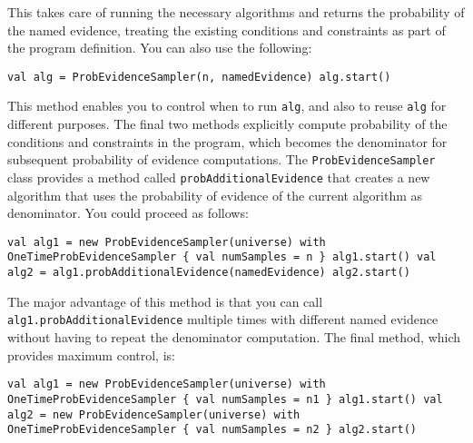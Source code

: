This takes care of running the necessary algorithms and returns the probability of the named evidence, treating the existing conditions and constraints as part of the program definition. You can also use the following:

\begin{flushleft}
\texttt{val alg = ProbEvidenceSampler(n, namedEvidence)
\newline alg.start()
}
\end{flushleft}

This method enables you to control when to run \texttt{alg}, and also to reuse \texttt{alg} for different purposes. The final two methods explicitly compute probability of the conditions and constraints in the program, which becomes the denominator for subsequent probability of evidence computations. The \texttt{ProbEvidenceSampler} class provides a method called \texttt{probAdditionalEvidence} that creates a new algorithm that uses the probability of evidence of the current algorithm as denominator. You could proceed as follows:

\begin{flushleft}
\texttt{val alg1 = new ProbEvidenceSampler(universe) with
\newline \tab OneTimeProbEvidenceSampler \{ val numSamples = n \}
\newline alg1.start()
\newline val alg2 = alg1.probAdditionalEvidence(namedEvidence)
\newline alg2.start()
}
\end{flushleft}

The major advantage of this method is that you can call \texttt{alg1.prob\-AdditionalEvidence} multiple times with different named evidence without having to repeat the denominator computation. The final method, which provides maximum control, is:

\begin{flushleft}
\texttt{val alg1 = new ProbEvidenceSampler(universe) with
\newline \tab OneTimeProbEvidenceSampler \{ val numSamples = n1 \}
\newline alg1.start()
\newline val alg2 = new ProbEvidenceSampler(universe) with
\newline \tab OneTimeProbEvidenceSampler \{ val numSamples = n2 \}
\newline alg2.start()
}
\end{flushleft}

